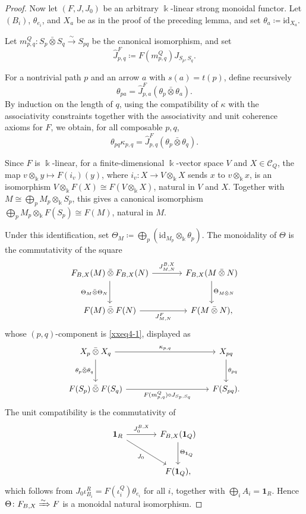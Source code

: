 \documentclass{amsart}
\newcommand{\id}{\mathrm{id}}
\newcommand{\btensor}{\mathbin{\bar{\otimes}}}
\theoremstyle{definition}
\theoremstyle{remark}
\numberwithin{equation}{section}
\begin{document}
\begin{proof}
Now let $(F,J,J_0)$ be an arbitrary $\Bbbk$-linear strong monoidal functor.
Let $(B_i)$, $\theta_{e_i}$, and $X_a$ be as in the proof of the preceding
lemma, and set $\theta_a\coloneqq\id_{X_a}$.

Let
$m^Q_{p,q}\colon S_p\btensor S_q\xrightarrow{\sim}S_{pq}$
be the canonical isomorphism, and set
\[
\widehat J^F_{p,q}
\coloneqq
F(m^Q_{p,q})
J_{S_p,S_q}.
\]

For a nontrivial path $p$ and an arrow $a$ with $s(a)=t(p)$, define
recursively
\[
\theta_{pa}
=
\widehat J^F_{p,a}
(\theta_p\btensor\theta_a).
\]
By induction on the length of $q$, using the compatibility of
$\kappa$ with the associativity constraints
together with the associativity and unit coherence axioms for $F$, we obtain, for all composable $p,q$,
\begin{equation}\label{xxeq4-1}
\theta_{pq}\kappa_{p,q}
=
\widehat J^F_{p,q}
(\theta_p\btensor\theta_q).
\end{equation}

Since $F$ is $\Bbbk$-linear, for a finite-dimensional $\Bbbk$-vector space $V$
and $X\in\mathcal C_Q$, the map $v\otimes_{\Bbbk} y\mapsto F(i_v)(y)$, where
$i_v\colon X\to V\otimes_{\Bbbk}X$ sends $x$ to $v\otimes_{\Bbbk} x$, is an isomorphism
$V\otimes_{\Bbbk}F(X)\cong F(V\otimes_{\Bbbk}X)$, natural in $V$ and $X$.
Together with $M\cong\bigoplus_pM_p\otimes_{\Bbbk}S_p$, this gives a canonical
isomorphism
$\bigoplus_pM_p\otimes_{\Bbbk}F(S_p)\cong F(M)$, natural in $M$.

Under this identification, set
$\Theta_M\coloneqq\bigoplus_p(\id_{M_p}\otimes_{\Bbbk}\theta_p)$.
The monoidality of $\Theta$ is the commutativity of the square
\[
\begin{tikzcd}[column sep=large,row sep=large]
F_{B,X}(M)\btensor F_{B,X}(N)
  \arrow[r,"J^{B,X}_{M,N}"]
  \arrow[d,"\Theta_M\btensor\Theta_N"']
&
F_{B,X}(M\btensor N)
  \arrow[d,"\Theta_{M\btensor N}"]\\
F(M)\btensor F(N)
  \arrow[r,"J^F_{M,N}"']
&
F(M\btensor N),
\end{tikzcd}
\]
whose $(p,q)$-component is \eqref{xxeq4-1}, displayed
as
\[
\begin{tikzcd}[column sep=10em,row sep=large]
X_p\btensor X_q
  \arrow[r,"\kappa_{p,q}"]
  \arrow[d,"\theta_p\btensor\theta_q"']
&
X_{pq}
  \arrow[d,"\theta_{pq}"]\\
F(S_p)\btensor F(S_q)
  \arrow[r,"F(m^Q_{p,q})\circ J_{S_p,S_q}"']
&
F(S_{pq}).
\end{tikzcd}
\]
The unit compatibility is the commutativity of
\[
\begin{tikzcd}[column sep=large,row sep=large]
\mathbf1_R
  \arrow[r,"J_0^{B,X}"]
  \arrow[dr,"J_0"']
&
F_{B,X}(\mathbf1_Q)
  \arrow[d,"\Theta_{\mathbf1_Q}"]\\
&
F(\mathbf1_Q),
\end{tikzcd}
\]
which follows from
$J_0\iota_{B_i}^R=F(\iota_i^Q)\theta_{e_i}$ for all $i$, together with
$\bigoplus_iA_i=\mathbf1_R$.
Hence $\Theta\colon F_{B,X}\xRightarrow{\sim}F$ is a monoidal natural
isomorphism.
\end{proof}
\end{document}
